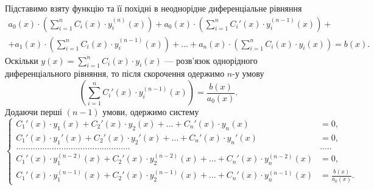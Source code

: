 Підставимо взяту функцію та її похідні в неоднорідне диференціальне рівняння
\begin{multline*}
 	a_0(x) \cdot \left( \sum_{i = 1}^n C_i(x) \cdot y_i^{(n)}(x) \right) + a_0(x) \cdot \left( \sum_{i = 1}^n C_i'(x) \cdot y_i^{(n - 1)}(x) \right) + \\ + a_1(x) \cdot \left( \sum_{i = 1}^n C_i(x) \cdot y_i^{(n - 1)}(x) \right) + \ldots + a_n(x) \cdot \left( \sum_{i = 1}^n C_i(x) \cdot y_i(x) \right) = b(x).
\end{multline*} 
Оскільки $y(x) = \sum_{i = 1}^n C_i(x) \cdot y_i(x)$ --- розв’язок однорідного диференціального рівняння, то після скорочення одержимо $n$-у умову
\begin{equation*}
	\left( \sum_{i = 1}^n C_i'(x) \cdot y_i^{(n - 1)}(x) \right) = \frac{b(x)}{a_0(x)}.
\end{equation*}
Додаючи перші $(n -1 )$ умови, одержимо систему
\begin{equation*}
	\left\{ \begin{aligned}
		C_1'(x) \cdot y_1(x) + C_2'(x) \cdot y_2(x) + \ldots + C_n'(x) \cdot y_n(x) &= 0, \\
		C_1'(x) \cdot y_1'(x) + C_2'(x) \cdot y_2'(x) + \ldots + C_n'(x) \cdot y_n'(x) &= 0, \\
		\ldots \ldots \ldots \ldots \ldots \ldots \ldots \ldots \ldots \ldots \ldots \ldots \ldots \ldots \ldots \ldots & . \ldots . \\
		C_1'(x) \cdot y_1^{(n - 2)}(x) + C_2'(x) \cdot y_2^{(n - 2)}(x) + \ldots + C_n'(x) \cdot y_n^{(n - 2)}(x) &= 0, \\
		C_1'(x) \cdot y_1^{(n - 1)}(x) + C_2'(x) \cdot y_2^{(n - 1)}(x) + \ldots + C_n'(x) \cdot y_n^{(n - 1)}(x) &= \frac{b(x)}{a_0(x)}.
	\end{aligned} \right.
\end{equation*}
 
